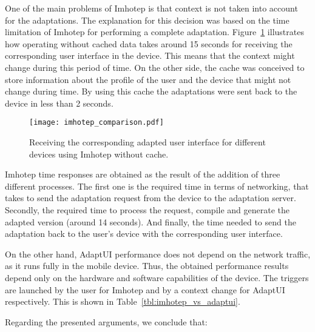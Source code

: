 One of the main problems of Imhotep is that context is not taken into account 
for the adaptations. The explanation for this decision was based on the time 
limitation of Imhotep for performing a complete adaptation. 
Figure~\ref{fig:imhotep_comparison} illustrates how operating without cached 
data takes around 15 seconds for receiving the corresponding user interface in 
the device. This means that the context might change during this period of time. 
On the other side, the cache was conceived to store information about the 
profile of the user and the device that might not change during time. By using 
this cache the adaptations were sent back to the device in less than 2 seconds.

\begin{figure}[H]
\centering
\texttt{[image: imhotep\_comparison.pdf]}
\caption{Receiving the corresponding adapted user interface for different
devices using Imhotep without cache.}
\label{fig:imhotep_comparison}
\end{figure}


Imhotep time responses are obtained as the result of the addition of three
different processes. The first one is the required time in terms of networking,
that takes to send the adaptation request from the device to the adaptation 
server. Secondly, the required time to process the request, compile and generate 
the adapted version (around 14 seconds). And finally, the time needed to send 
the adaptation back to the user's device with the corresponding user interface. 

On the other hand, AdaptUI performance does not depend on the network traffic, 
as it runs fully in the mobile device. Thus, the obtained performance results 
depend only on the hardware and software capabilities of the device. The 
triggers are launched by the user for Imhotep and by a context change for 
AdaptUI respectively. This is shown in Table~\ref{tbl:imhotep_vs_adaptui}.

Regarding the presented arguments, we conclude that:

